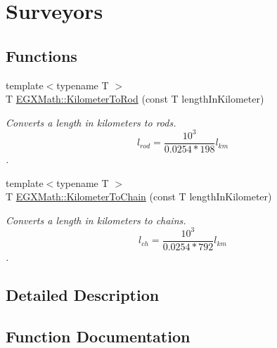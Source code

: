 \hypertarget{group___e_g_x_math-_conversions-_length_conversions-_s_i-_kilometer-_surveyors}{}\section{Surveyors}
\label{group___e_g_x_math-_conversions-_length_conversions-_s_i-_kilometer-_surveyors}
\subsection*{Functions}
\begin{DoxyCompactItemize}
\item 
{\footnotesize template$<$typename T $>$ }\\T \mbox{\hyperlink{group___e_g_x_math-_conversions-_length_conversions-_s_i-_kilometer-_surveyors_gae57f6033d241f64aa645a42bfe354567}{E\+G\+X\+Math\+::\+Kilometer\+To\+Rod}} (const T length\+In\+Kilometer)
\begin{DoxyCompactList}\small\item\em Converts a length in kilometers to rods. \[ l_{rod}= \frac{10^{3}}{0.0254 * 198} l_{km} \]. \end{DoxyCompactList}\item 
{\footnotesize template$<$typename T $>$ }\\T \mbox{\hyperlink{group___e_g_x_math-_conversions-_length_conversions-_s_i-_kilometer-_surveyors_ga42dd7fe86fb9ffdbc0a82b58876f9d6d}{E\+G\+X\+Math\+::\+Kilometer\+To\+Chain}} (const T length\+In\+Kilometer)
\begin{DoxyCompactList}\small\item\em Converts a length in kilometers to chains. \[ l_{ch}= \frac{10^{3}}{0.0254 * 792} l_{km} \]. \end{DoxyCompactList}\end{DoxyCompactItemize}


\subsection{Detailed Description}


\subsection{Function Documentation}
\mbox{\label{group___e_g_x_math-_conversions-_length_conversions-_s_i-_kilometer-_surveyors_ga42dd7fe86fb9ffdbc0a82b58876f9d6d}} 
